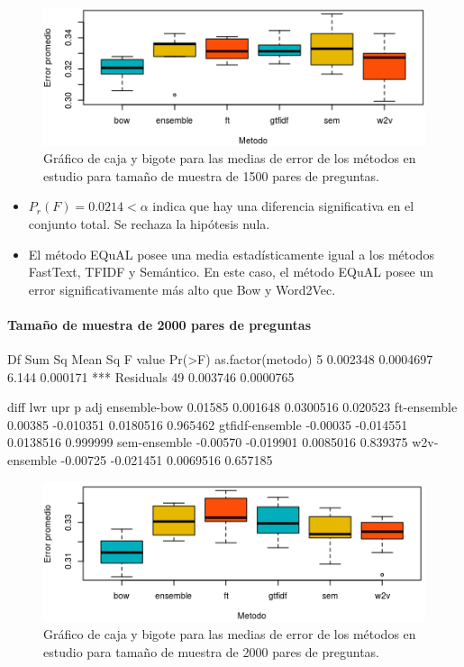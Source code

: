 \begin{figure}
	\centering
	\includegraphics[width=0.7\linewidth]{10_resultados/imagenes/anova_1500}
	\caption{Gráfico de caja y bigote para las medias de error de los métodos en estudio para tamaño de muestra de 1500 pares de preguntas.}
	\label{fig:anova1500}
\end{figure}

\begin{itemize}
	\item \(P_r(F)= 0.0214 < \alpha\) indica que hay una diferencia significativa en el conjunto total. Se rechaza la hipótesis nula.
	\item El método EQuAL posee una media estadísticamente igual a los métodos FastText, TFIDF y Semántico. En este caso, el método EQuAL posee un error significativamente más alto que Bow y Word2Vec.
\end{itemize}

\paragraph{Tamaño de muestra de 2000 pares de preguntas}

\begin{rc}
                 Df   Sum Sq   Mean Sq F value   Pr(>F)
as.factor(metodo)  5 0.002348 0.0004697   6.144 0.000171 ***
Residuals         49 0.003746 0.0000765
\end{rc}

\begin{rc}
                  diff       lwr       upr      p adj
ensemble-bow     0.01585  0.001648 0.0300516 0.020523
ft-ensemble      0.00385 -0.010351 0.0180516 0.965462
gtfidf-ensemble -0.00035 -0.014551 0.0138516 0.999999
sem-ensemble    -0.00570 -0.019901 0.0085016 0.839375
w2v-ensemble    -0.00725 -0.021451 0.0069516 0.657185
\end{rc}

\begin{figure}
	\centering
	\includegraphics[width=0.7\linewidth]{10_resultados/imagenes/anova_2000}
	\caption{Gráfico de caja y bigote para las medias de error de los métodos en estudio para tamaño de muestra de 2000 pares de preguntas.}
	\label{fig:anova2000}
\end{figure}


